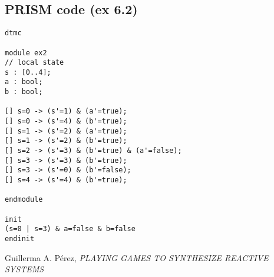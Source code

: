 \documentclass[12pt]{article}
\begin{document}
\subsection{PRISM code (ex 6.2)}
\begin{lstlisting}[language=PRISM]
dtmc

module ex2
// local state
s : [0..4];
a : bool;
b : bool;

[] s=0 -> (s'=1) & (a'=true);
[] s=0 -> (s'=4) & (b'=true);
[] s=1 -> (s'=2) & (a'=true);
[] s=1 -> (s'=2) & (b'=true);
[] s=2 -> (s'=3) & (b'=true) & (a'=false);
[] s=3 -> (s'=3) & (b'=true);
[] s=3 -> (s'=0) & (b'=false);
[] s=4 -> (s'=4) & (b'=true);

endmodule

init
(s=0 | s=3) & a=false & b=false
endinit
\end{lstlisting}



\begin{thebibliography}{9}
	
	Guillerma A. Pérez,
	\textit{PLAYING GAMES TO SYNTHESIZE REACTIVE SYSTEMS}
	
\end{thebibliography}
\end{document}
